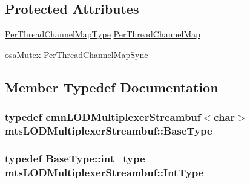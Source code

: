\subsection*{Protected Attributes}
\begin{DoxyCompactItemize}
\item 
\hyperlink{classmts_l_o_d_multiplexer_streambuf_aff1696a1ada12cd77decfe1deb5d8a63}{Per\+Thread\+Channel\+Map\+Type} \hyperlink{classmts_l_o_d_multiplexer_streambuf_af30117fcef2a05140848f7ca2678d87b}{Per\+Thread\+Channel\+Map}
\item 
\hyperlink{classosa_mutex}{osa\+Mutex} \hyperlink{classmts_l_o_d_multiplexer_streambuf_a9a3e813b12e3041f208b89134af18cd5}{Per\+Thread\+Channel\+Map\+Sync}
\end{DoxyCompactItemize}


\subsection{Member Typedef Documentation}
\hypertarget{classmts_l_o_d_multiplexer_streambuf_a61c8f5498c012321fdc38e97a43393a2}{}
\subsubsection[{Base\+Type}]{\setlength{\rightskip}{0pt plus 5cm}typedef {\bf cmn\+L\+O\+D\+Multiplexer\+Streambuf}$<$char$>$ {\bf mts\+L\+O\+D\+Multiplexer\+Streambuf\+::\+Base\+Type}}\label{classmts_l_o_d_multiplexer_streambuf_a61c8f5498c012321fdc38e97a43393a2}
\hypertarget{classmts_l_o_d_multiplexer_streambuf_a21823525be07ef7a8c1c3b053f3fedf2}{}
\subsubsection[{Int\+Type}]{\setlength{\rightskip}{0pt plus 5cm}typedef {\bf Base\+Type\+::int\+\_\+type} {\bf mts\+L\+O\+D\+Multiplexer\+Streambuf\+::\+Int\+Type}}\label{classmts_l_o_d_multiplexer_streambuf_a21823525be07ef7a8c1c3b053f3fedf2}
\hypertarget{classmts_l_o_d_multiplexer_streambuf_aa6778f2331bcb1be3e4817612b97f42a}{}
